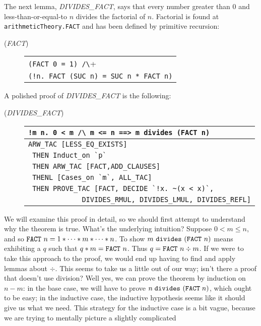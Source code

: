The next lemma, {\small{\it DIVIDES\_FACT\/}}, says that every number
greater than $0$ and less-than-or-equal-to $n$ divides the factorial of
$n$. Factorial is found at \verb+arithmeticTheory.FACT+ and has been
defined by primitive recursion:
\begin{description}
\item [\small{({\it FACT\/})}]
\begin{tabular}[t]{l}
\verb+(FACT 0 = 1) /\+ \\
\verb+(!n. FACT (SUC n) = SUC n * FACT n)+ \\
\end{tabular}
\end{description}
A polished proof of {\small{\it DIVIDES\_FACT\/}} is the following:
\begin{description}
\item [\small{({\it DIVIDES\_FACT\/})}]
\begin{tabular}[t]{l}
\verb+!m n. 0 < m /\ m <= n ==> m divides (FACT n)+ \\ \hline
\verb+ARW_TAC [LESS_EQ_EXISTS]+ \\
\verb+ THEN Induct_on `p`+ \\
\verb+ THEN ARW_TAC [FACT,ADD_CLAUSES]+ \\
\verb+ THENL [Cases_on `m`, ALL_TAC]+ \\
\verb+ THEN PROVE_TAC [FACT, DECIDE `!x. ~(x < x)`,+ \\
\verb+             DIVIDES_RMUL, DIVIDES_LMUL, DIVIDES_REFL]+ \\
\end{tabular}
\end{description}
We will examine this proof in detail, so we should first attempt to
understand why the theorem is true. What's the underlying intuition?
Suppose $0 < m \leq n$, and so $\mbox{\tt FACT}\ n = 1 * \cdots * m *
\cdots * n$. To show $m\ \mbox{\tt divides}\ (\mbox{\tt FACT}\ n)$
means exhibiting a $q$ such that $q * m = \mbox{\tt FACT}\ n$. Thus $q
= \mbox{\tt FACT}\ n \div m$. If we were to take this approach to the
proof, we would end up having to find and apply lemmas about $\div$.
This seems to take us a little out of our way; isn't there a proof
that doesn't use division? Well yes, we can prove the theorem by
induction on $n - m$: in the base case, we will have to prove $n\;
\mbox{\tt divides}\ (\mbox{\tt FACT}\; n)$, which ought to be easy; in
the inductive case, the inductive hypothesis seems like it should give
us what we need. This strategy for the inductive case is a bit vague,
because we are trying to mentally picture a slightly complicated
